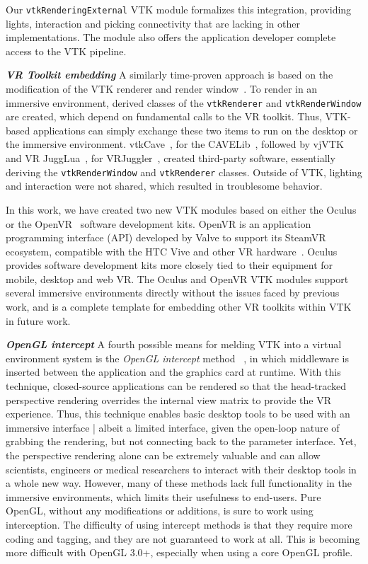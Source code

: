 Our \texttt{vtkRenderingExternal} VTK module formalizes this integration, providing lights, interaction and picking connectivity that are lacking in other implementations. The module also offers the application developer complete access to the VTK pipeline.

\textbf{\textit{VR Toolkit embedding}} A similarly time-proven approach is based on the modification of the VTK renderer and render window~\cite{van2000vista, Hannema:2001, Shamonin02vtkcave, Belleman:2003}. 
To render in an immersive environment, derived classes of the
\texttt{vtkRenderer} and \texttt{vtkRenderWindow} are created, which depend on fundamental calls to the VR toolkit.
Thus, VTK-based applications can simply exchange these two items to run on the desktop or the immersive environment.
vtkCave~\cite{Tufo:1999}, for the CAVELib~\cite{CAVELib:2016}, followed by
vjVTK~\cite{Blom:2006} and VR JuggLua~\cite{Pavlik:2012}, for
VRJuggler~\cite{Bierbaum:2001}, created third-party software, essentially
deriving the \texttt{vtkRenderWindow} and \texttt{vtkRenderer} classes. Outside of VTK, lighting and interaction were not shared, which resulted in troublesome behavior.

In this work, we have created two new VTK modules based on either the Oculus~\cite{Oculus:2016} or the OpenVR~\cite{OpenVR:2016} software development kits.
OpenVR is an application programming interface (API) developed by Valve to support its SteamVR ecosystem, compatible with the HTC Vive and other VR hardware~\cite{Road2VR:2015}. Oculus provides software development kits more closely tied to their equipment for mobile, desktop and web VR. The Oculus and OpenVR VTK modules support several immersive environments directly
without the issues faced by previous work, and is a complete template
for embedding other VR toolkits within VTK in future work.

\textit{\textbf{OpenGL intercept}}
A fourth possible means for melding VTK into a virtual environment system
is the \textit{OpenGL intercept} method
~\cite{Humphreys:2001,Humphreys:2002,Zielinski:2014,TechViz:2016,Conduit:2016}, in which middleware is inserted between the application and the graphics card at runtime.
With this technique, closed-source applications can be rendered so that
the head-tracked perspective rendering overrides the internal view matrix
to provide the VR experience.
Thus, this technique enables basic desktop tools to be used with an
immersive interface | albeit a limited interface, given the open-loop nature of
grabbing the rendering, but not connecting back to the parameter interface.
Yet, the perspective rendering alone can be extremely valuable and can allow
scientists, engineers or medical researchers to interact with their desktop
tools in a whole new way. However, many of these methods lack full functionality in the immersive environments, which limits their usefulness to end-users.
Pure OpenGL, without any modifications or additions,  is sure to work using interception.
The difficulty of using intercept methods is that they require more coding
and tagging, and they are not guaranteed to work at all. This is becoming
more difficult with OpenGL 3.0+, especially when using a core OpenGL profile.

